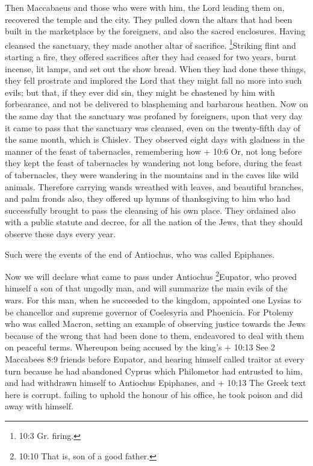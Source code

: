  Then Maccabaeus and those who were with him, the Lord
leading them on, recovered the temple and the city.  They
pulled down the altars that had been built in the marketplace by the
foreigners, and also the sacred enclosures.  Having cleansed
the sanctuary, they made another altar of sacrifice. \footnote{10:3 Gr.
  firing.}Striking flint and starting a fire, they offered sacrifices
after they had ceased for two years, burnt incense, lit lamps, and set
out the show bread.  When they had done these things, they
fell prostrate and implored the Lord that they might fall no more into
such evils; but that, if they ever did sin, they might be chastened by
him with forbearance, and not be delivered to blaspheming and barbarous
heathen.  Now on the same day that the sanctuary was
profaned by foreigners, upon that very day it came to pass that the
sanctuary was cleansed, even on the twenty-fifth day of the same month,
which is Chislev.  They observed eight days with gladness in
the manner of the feast of tabernacles, remembering how + 10:6 Or, not
long before they kept the feast of tabernacles by wandering not long
before, during the feast of tabernacles, they were wandering in the
mountains and in the caves like wild animals.  Therefore
carrying wands wreathed with leaves, and beautiful branches, and palm
fronds also, they offered up hymns of thanksgiving to him who had
successfully brought to pass the cleansing of his own place.
 They ordained also with a public statute and decree, for
all the nation of the Jews, that they should observe these days every
year.

 Such were the events of the end of Antiochus, who was
called Epiphanes.

 Now we will declare what came to pass under Antiochus
\footnote{10:10 That is, son of a good father.}Eupator, who proved
himself a son of that ungodly man, and will summarize the main evils of
the wars.  For this man, when he succeeded to the kingdom,
appointed one Lysias to be chancellor and supreme governor of Coelesyria
and Phoenicia.  For Ptolemy who was called Macron, setting
an example of observing justice towards the Jews because of the wrong
that had been done to them, endeavored to deal with them on peaceful
terms.  Whereupon being accused by the king's + 10:13 See 2
Maccabees 8:9 friends before Eupator, and hearing himself called traitor
at every turn because he had abandoned Cyprus which Philometor had
entrusted to him, and had withdrawn himself to Antiochus Epiphanes, and
+ 10:13 The Greek text here is corrupt. failing to uphold the honour of
his office, he took poison and did away with himself.

